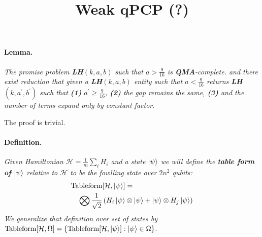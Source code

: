 \documentclass{article}
\newcommand{\commentt}[1]{\textcolor{blue}{ \textbf{[COMMENT]} #1}}
\newcommand{\ctt}[1]{\commentt{#1}}
\newcommand{\PSI}{{\ket{\psi}}}
\begin{document}
    
\title{Weak qPCP (?)}
    
\maketitle
\begin{multicols*}{2}


\paragraph{Lemma.} \textit{ The promise problem \textbf{LH}\((k,a,b)\) such that \(a>\frac{9}{16} \) is \textbf{QMA}-complete. and there exist reduction that given a \textbf{LH}\((k,a,b)\) entity such that \(a < \frac{9}{16}\) returns \textbf{LH}\((k,a^\prime ,b^\prime)\) such that \textbf{(1)} \(a^\prime \ge \frac{9}{16}\), \textbf{(2)} the gap remains the same, \textbf{(3)} and the number of terms expand only by constant factor}.

The proof is trivial. 

\paragraph{Definition.} \textit{ Given Hamiltonian \( \mathcal{H} = \frac{1}{m}\sum_{i}{H_i}\) and a state \(\PSI\) we will define the \textbf{table form of} \( \PSI \) relative to \( \mathcal {H} \) to be the fowlling state over \(2n^2\) qubits: 
\begin{equation}
    \begin{split}
        & \text{Tableform}[\mathcal{H}, \PSI ] =
        \\ & \ \ \ \bigotimes\frac{1}{\sqrt{2}}\left(H_i\ket{\psi}\otimes \ket{\psi}+ \ket{\psi}\otimes H_j \ket{\psi}\right)
    \end{split}
\end{equation} We generalize that definition over set of states by  \(\text{Tableform}[\mathcal{H}, \Omega] = \{\text{Tableform}[\mathcal{H}, \PSI ] : \PSI \in \Omega \} \)}.


\end{multicols*}
\end{document}
